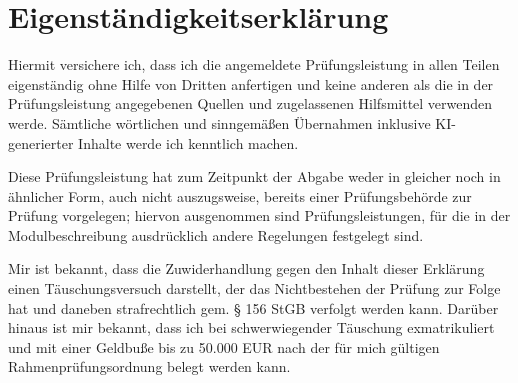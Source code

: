 \newpage
{} %

\section*{Eigenständigkeitserklärung}
Hiermit versichere ich, dass ich die angemeldete Prüfungsleistung in allen Teilen eigenständig ohne Hilfe von Dritten anfertigen und keine anderen als die in der Prüfungsleistung angegebenen Quellen und zugelassenen Hilfsmittel verwenden werde. Sämtliche wörtlichen und sinngemäßen Übernahmen inklusive KI-generierter Inhalte werde ich kenntlich machen.

\vspace{1em}

Diese Prüfungsleistung hat zum Zeitpunkt der Abgabe weder in gleicher noch in ähnlicher Form, auch nicht auszugsweise, bereits einer Prüfungsbehörde zur Prüfung vorgelegen; hiervon ausgenommen sind Prüfungsleistungen, für die in der Modulbeschreibung ausdrücklich andere Regelungen festgelegt sind.

\vspace{1em}

Mir ist bekannt, dass die Zuwiderhandlung gegen den Inhalt dieser Erklärung einen Täuschungsversuch darstellt, der das Nichtbestehen der Prüfung zur Folge hat und daneben strafrechtlich gem. § 156 StGB verfolgt werden kann. Darüber hinaus ist mir bekannt, dass ich bei schwerwiegender Täuschung exmatrikuliert und mit einer Geldbuße bis zu 50.000 EUR nach der für mich gültigen Rahmenprüfungsordnung belegt werden kann.

